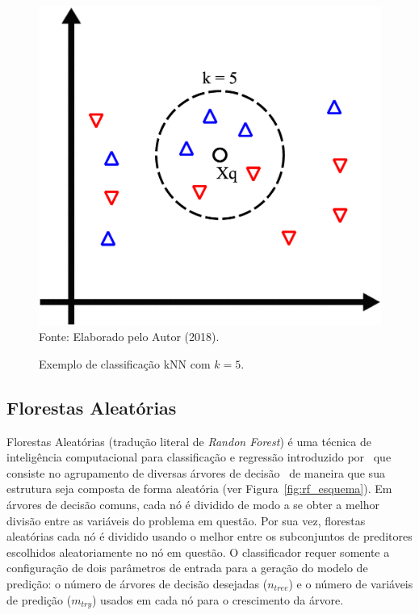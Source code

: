 \begin{figure}[!htb]
	\centering
	\caption{Exemplo de classificação kNN com $k = 5$.}
	\includegraphics[width=0.6\linewidth]{knn_esquema.eps}\\
	{\small Fonte: Elaborado pelo Autor (2018).}
	\label{fig:knn_esquema}
\end{figure}

\subsection{Florestas Aleatórias}

Florestas Aleatórias (tradução literal de \textit{Randon Forest}) é uma técnica de inteligência computacional para classificação e regressão introduzido por~ que consiste no agrupamento de diversas árvores de decisão~\cite{safavian1991survey} de maneira que sua estrutura seja composta de forma aleatória (ver Figura~\ref{fig:rf_esquema}). Em árvores de decisão comuns, cada nó é dividido de modo a se obter a melhor divisão entre as variáveis do problema em questão. Por sua vez, florestas aleatórias cada nó é dividido usando o melhor entre os subconjuntos de preditores escolhidos aleatoriamente no nó em questão. O classificador requer somente a configuração de dois parâmetros de entrada para a geração do modelo de predição: o número de árvores de decisão desejadas ($n_{tree}$) e o número de variáveis de predição ($m_{try}$) usados em cada nó para o crescimento da árvore.

